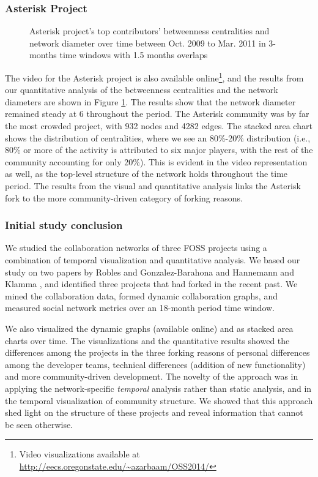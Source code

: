\documentclass[11pt]{report}
\begin{document}
\subsubsection{Asterisk Project}
\begin{figure}
\centering
{}
\justifying
{}
\caption{Asterisk project's top contributors' betweenness centralities and network diameter over time between Oct. 2009 to Mar. 2011 in 3-months time windows with 1.5 months overlaps}
\label{figureAsteriskStackedAreaChart}
\end{figure}

The video for the Asterisk project is also available online\footnote{Video visualizations available at \href{http://eecs.oregonstate.edu/~azarbaam/OSS2014/}{http://eecs.oregonstate.edu/\textasciitilde azarbaam/OSS2014/}}, and the results from our quantitative analysis of the betweenness centralities and the network diameters are shown in Figure \ref{figureAsteriskStackedAreaChart}. The results show that the network diameter remained steady at 6 throughout the period. The Asterisk community was by far the most crowded project, with 932 nodes and 4282 edges. The stacked area chart shows the distribution of centralities, where we see an 80\%-20\% distribution (i.e., 80\% or more of the activity is attributed to six major players, with the rest of the community accounting for only 20\%). This is evident in the video representation as well, as the top-level structure of the network holds throughout the time period. The results from the visual and quantitative analysis links the Asterisk fork to the more community-driven category of forking reasons.

\subsubsection{Initial study conclusion}
We studied the collaboration networks of three FOSS projects using a combination of temporal visualization and quantitative analysis. We based our study on two papers by Robles and Gonzalez-Barahona \cite{Robles} and Hannemann and Klamma \cite{Hannemann}, and identified three projects that had forked in the recent past. We mined the collaboration data, formed dynamic collaboration graphs, and measured social network metrics over an 18-month period time window.

We also visualized the dynamic graphs (available online) and as stacked area charts over time. The visualizations and the quantitative results showed the differences among the projects in the three forking reasons of personal differences among the developer teams, technical differences (addition of new functionality) and more community-driven development. The novelty of the approach was in applying the network-specific \textit{temporal} analysis rather than static analysis, and in the temporal visualization of community structure. We showed that this approach shed light on the structure of these projects and reveal information that cannot be seen otherwise.
\end{document}
